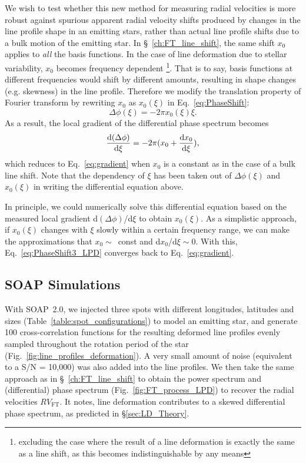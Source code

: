 We wish to test whether this new method for measuring radial velocities is more
robust against spurious apparent radial velocity shifts produced by changes in the
line profile shape in an emitting stars, rather than actual line profile shifts due to a bulk motion
of the emitting star.
In \S~\ref{ch:FT_line_shift}, the same shift $x_0$ applies to \textit{all} the basis functions. 
In the case of line deformation due to stellar variability, $x_0$ becomes frequency dependent 
\footnote{excluding the case where the result of a line deformation is exactly the same as a line shift, as 
this becomes indistinguishable by any means}. That is to say, basis functions at different frequencies would 
shift by different amounts, resulting in shape changes (e.g. skewness) in the line profile. 
Therefore we modify the translation property of Fourier transform
by rewriting $x_0$ as $x_0(\xi)$ in Eq.~\ref{eq:PhaseShift}:
\begin{equation}
	\Delta \phi(\xi) = -2 \pi x_0(\xi) \xi.
\label{eq:PhaseShift2_LPD}
\end{equation}
As a result, the local gradient of the differential phase spectrum becomes 
\begin{equation}
	\dv{(\Delta \phi)}{\xi} = -2 \pi (x_0 + \dv{x_0}{\xi}),
\label{eq:PhaseShift3_LPD}
\end{equation}
which reduces to Eq.~\ref{eq:gradient} when $x_0$ is a constant as in the case of a bulk line shift.
Note that the dependency of $\xi$ has been taken out of $\Delta \phi(\xi)$ and 
$x_0(\xi)$ in writing the differential equation above. 

In principle, we could numerically solve this differential equation based on the measured local gradient d$(\Delta \phi)$/d$\xi$
to obtain $x_0(\xi)$. As a simplistic approach, if $x_0(\xi)$ changes with $\xi$ slowly within a certain frequency range,
we can make the approximations that $x_0\sim$~const and d$x_0$/d$\xi\sim0$. With this, Eq.~\ref{eq:PhaseShift3_LPD} 
converges back to Eq.~\ref{eq:gradient}.

\subsection{SOAP Simulations}
\label{sec:Simulations}


With SOAP~2.0, we injected three spots with different longitudes, latitudes and sizes (Table~\ref{table:spot_configurations}) to model an emitting star, and generate 100 cross-correlation functions for the resulting  deformed line profiles evenly sampled throughout the rotation period of the star (Fig.~\ref{fig:line_profiles_deformation}). A very small amount of noise (equivalent to a S/N = 10,000) was also added into the line profiles. We then take the same approach as in  \S~\ref{ch:FT_line_shift} to obtain the power spectrum and (differential) phase spectrum (Fig.~\ref{fig:FT_process_LPD}) to recover the radial velocities $RV_\text{FT}$. It notes, line deformation contributes to a skewed differential phase spectrum, as predicted in \S\ref{sec:LD_Theory}. 

